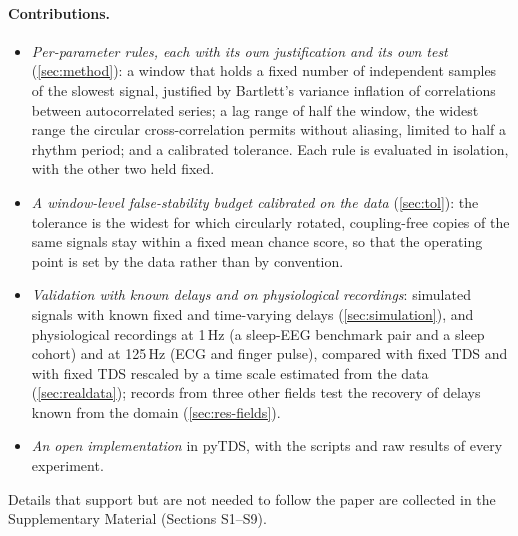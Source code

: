 \documentclass[11pt,a4paper]{article}
\begin{document}
\paragraph{Contributions.}
\begin{itemize}
\setlength{\itemsep}{1pt}
\item \emph{Per-parameter rules, each with its own justification and its own test} (\cref{sec:method}): a window that holds a fixed number of independent samples of the slowest signal, justified by Bartlett's variance inflation of correlations between autocorrelated series; a lag range of half the window, the widest range the circular cross-correlation permits without aliasing, limited to half a rhythm period; and a calibrated tolerance. Each rule is evaluated in isolation, with the other two held fixed.
\item \emph{A window-level false-stability budget calibrated on the data} (\cref{sec:tol}): the tolerance is the widest for which circularly rotated, coupling-free copies of the same signals stay within a fixed mean chance score, so that the operating point is set by the data rather than by convention.
\item \emph{Validation with known delays and on physiological recordings}: simulated signals with known fixed and time-varying delays (\cref{sec:simulation}), and physiological recordings at 1\,Hz (a sleep-EEG benchmark pair and a sleep cohort) and at 125\,Hz (ECG and finger pulse), compared with fixed TDS and with fixed TDS rescaled by a time scale estimated from the data (\cref{sec:realdata}); records from three other fields test the recovery of delays known from the domain (\cref{sec:res-fields}).
\item \emph{An open implementation} in pyTDS, with the scripts and raw results of every experiment.
\end{itemize}
Details that support but are not needed to follow the paper are collected in the Supplementary Material (Sections S1--S9).
\end{document}
